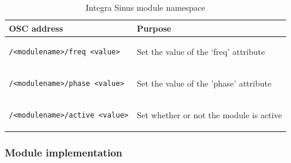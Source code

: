 \begin{table}
  \begin{center}
    \begin{tabular}{|m{12em}|m{17em}|}
      \hline
      \textbf{OSC address} & \textbf{Purpose} \\
      \hline
      \begin{minipage}[0pt]{12em}
        \begin{footnotesize}
\begin{verbatim}/<modulename>/freq <value>\end{verbatim}
\end{footnotesize}
\end{minipage}
&
\begin{small}
  Set the value of the `freq' attribute
\end{small}
\\
\hline
      \begin{minipage}[0pt]{12em}
\begin{footnotesize}
\begin{verbatim}/<modulename>/phase <value>\end{verbatim}
\end{footnotesize} 
\end{minipage}
&
\begin{small}
  Set the value of the 'phase' attribute
\end{small}
\\
\hline
\begin{minipage}[0pt]{12em}
\begin{footnotesize}
\begin{verbatim}/<modulename>/active <value>\end{verbatim}
\end{footnotesize}
\end{minipage}
& 
\begin{small}
  Set whether or not the module is active
\end{small}
\\
\hline
\end{tabular} 
\end{center}
\caption{Integra Sinus module namespace}
\label{tab:module_namespace}
\end{table}

\subsubsection{Module implementation}\label{subsubsec:module_implementation}

